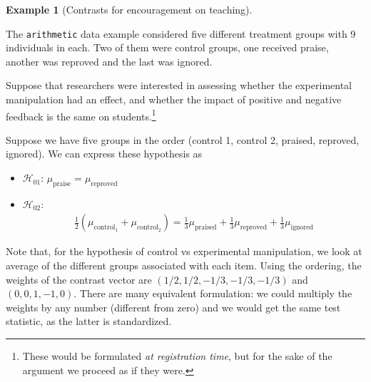 \documentclass[
  11pt,
  letterpaper,
]{scrbook}
\providecommand{\tightlist}{%
  \setlength{\itemsep}{0pt}\setlength{\parskip}{0pt}}\usepackage{longtable,booktabs,array}
\theoremstyle{definition}
\newtheorem{example}{Example}[chapter]
\theoremstyle{remark}
\begin{document}
\begin{example}[Contrasts for encouragement on
teaching]\protect\hypertarget{exm-contrast-teaching}{}\label{exm-contrast-teaching}

The \texttt{arithmetic} data example considered five different treatment
groups with 9 individuals in each. Two of them were control groups, one
received praise, another was reproved and the last was ignored.

Suppose that researchers were interested in assessing whether the
experimental manipulation had an effect, and whether the impact of
positive and negative feedback is the same on students.\footnote{These
  would be formulated \emph{at registration time}, but for the sake of
  the argument we proceed as if they were.}

Suppose we have five groups in the order (control 1, control 2, praised,
reproved, ignored). We can express these hypothesis as

\begin{itemize}
\tightlist
\item
  \(\mathscr{H}_{01}\): \(\mu_{\text{praise}} = \mu_{\text{reproved}}\)
\item
  \(\mathscr{H}_{02}\): \begin{align*}
  \frac{1}{2}(\mu_{\text{control}_1}+\mu_{\text{control}_2}) = \frac{1}{3}\mu_{\text{praised}} + \frac{1}{3}\mu_{\text{reproved}} + \frac{1}{3}\mu_{\text{ignored}}
  \end{align*}
\end{itemize}

Note that, for the hypothesis of control vs experimental manipulation,
we look at average of the different groups associated with each item.
Using the ordering, the weights of the contrast vector are
\((1/2, 1/2, -1/3, -1/3, -1/3)\) and \((0, 0, 1, -1, 0)\). There are
many equivalent formulation: we could multiply the weights by any number
(different from zero) and we would get the same test statistic, as the
latter is standardized.


\end{example}
\end{document}
